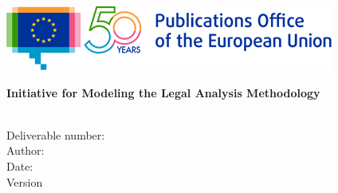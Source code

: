 \begin{titlepage}
\begin{center}
\vspace{1cm}

  \begin{center}


  \includegraphics[scale=.71]{images/logos/OP-50years-EN}
  \vspace{2mm}

  \end{center}
  \vspace{4cm}
  \textbf{{\large Initiative for Modeling the Legal Analysis Methodology\\}}
  \vspace{2cm}
  
  \begin{spacing}{2.5}
    \textbf{\Huge \DelTitle}\\ \vspace{2cm}
    {\large Deliverable number: \DelNumber} \\ %
	{\large Author: \DelAuthor} \\ %
	{\large Date: \DelDate} \\ %
    {\large Version \DelVersion}
  \end{spacing}
  
  \vspace*{\fill}


\end{center}
\end{titlepage}


